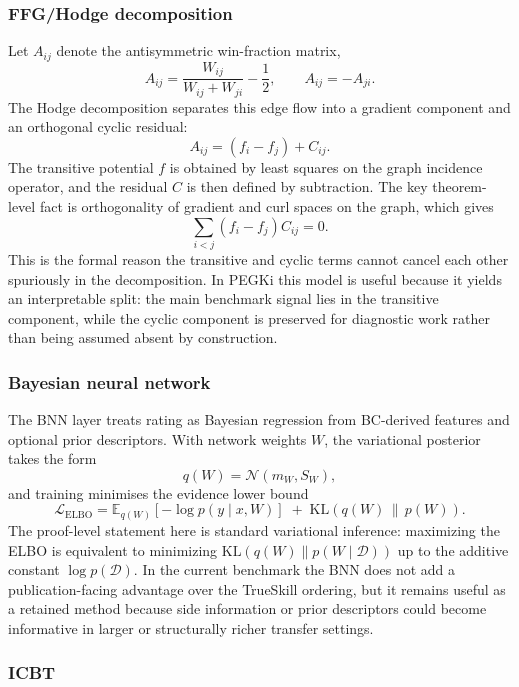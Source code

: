 \documentclass[twoside,twocolumn,9pt]{article}
\begin{document}
\subsubsection{FFG/Hodge decomposition}

Let $A_{ij}$ denote the antisymmetric win-fraction matrix,
\[
A_{ij}=\frac{W_{ij}}{W_{ij}+W_{ji}}-\frac{1}{2},
\qquad
A_{ij}=-A_{ji}.
\]
The Hodge decomposition separates this edge flow into a gradient component and an orthogonal cyclic residual:
\[
A_{ij}=(f_i-f_j)+C_{ij}.
\]
The transitive potential $f$ is obtained by least squares on the graph incidence operator, and the residual $C$ is then defined by subtraction. The key theorem-level fact is orthogonality of gradient and curl spaces on the graph, which gives
\[
\sum_{i<j}(f_i-f_j)C_{ij}=0.
\]
This is the formal reason the transitive and cyclic terms cannot cancel each other spuriously in the decomposition.\cite{Balduzzi2019OpenEndedGames} In PEGKi this model is useful because it yields an interpretable split: the main benchmark signal lies in the transitive component, while the cyclic component is preserved for diagnostic work rather than being assumed absent by construction.

\subsubsection{Bayesian neural network}

The BNN layer treats rating as Bayesian regression from BC-derived features and optional prior descriptors. With network weights $W$, the variational posterior takes the form
\[
q(W)=\mathcal{N}(m_W,S_W),
\]
and training minimises the evidence lower bound
\[
\mathcal{L}_{\mathrm{ELBO}}
=
\mathbb{E}_{q(W)}[-\log p(y\mid x,W)]
\;+\;
\mathrm{KL}\!\left(q(W)\,\|\,p(W)\right).
\]
The proof-level statement here is standard variational inference: maximizing the ELBO is equivalent to minimizing $\mathrm{KL}(q(W)\|p(W\mid \mathcal{D}))$ up to the additive constant $\log p(\mathcal{D})$. In the current benchmark the BNN does not add a publication-facing advantage over the TrueSkill ordering, but it remains useful as a retained method because side information or prior descriptors could become informative in larger or structurally richer transfer settings.

\subsubsection{ICBT}
\end{document}
